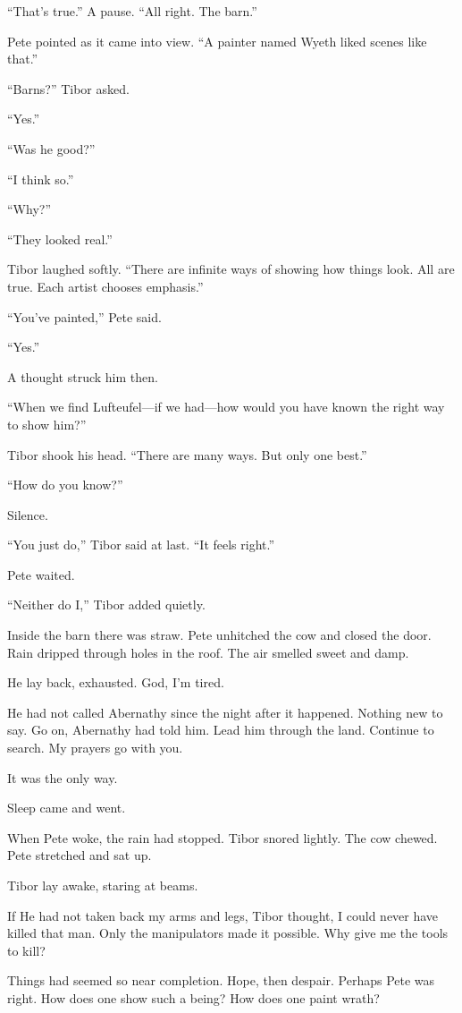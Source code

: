 “That’s true.” A pause. “All right. The barn.”

Pete pointed as it came into view. “A painter named Wyeth liked scenes like that.”

“Barns?” Tibor asked.

“Yes.”

“Was he good?”

“I think so.”

“Why?”

“They looked real.”

Tibor laughed softly. “There are infinite ways of showing how things look. All are true. Each artist chooses emphasis.”

“You’ve painted,” Pete said.

“Yes.”

A thought struck him then.

“When we find Lufteufel—if we had—how would you have known the right way to show him?”

Tibor shook his head. “There are many ways. But only one best.”

“How do you know?”

Silence.

“You just do,” Tibor said at last. “It feels right.”

Pete waited.

“Neither do I,” Tibor added quietly.

Inside the barn there was straw. Pete unhitched the cow and closed the door. Rain dripped through holes in the roof. The air smelled sweet and damp.

He lay back, exhausted. God, I’m tired.

He had not called Abernathy since the night after it happened. Nothing new to say. Go on, Abernathy had told him. Lead him through the land. Continue to search. My prayers go with you.

It was the only way.

Sleep came and went.

When Pete woke, the rain had stopped. Tibor snored lightly. The cow chewed. Pete stretched and sat up.

Tibor lay awake, staring at beams.

If He had not taken back my arms and legs, Tibor thought, I could never have killed that man. Only the manipulators made it possible. Why give me the tools to kill?

Things had seemed so near completion. Hope, then despair. Perhaps Pete was right. How does one show such a being? How does one paint wrath?

